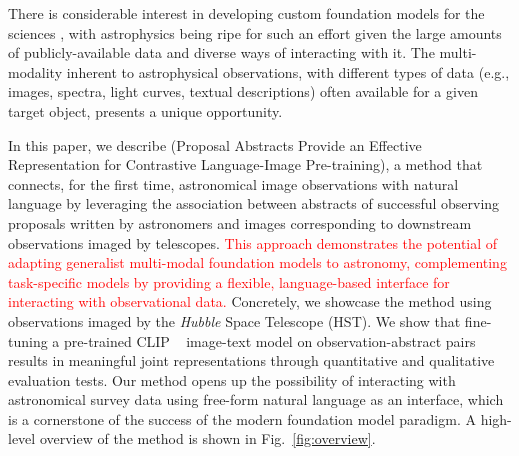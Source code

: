 \documentclass{article} %
\newcommand{\hubble}{\emph{Hubble}\xspace}
\newcommand{\changes}[1]{\textcolor{red}{#1}}
\begin{document}
There is considerable interest in developing custom foundation models for the sciences \citep[e.g., ][]{batatia2023foundation,subramanian2023towards,mccabe2023multiple,Birk:2024knn,vig2024finetuning,heinrich2024masked}, with astrophysics being ripe for such an effort given the large amounts of publicly-available data and diverse ways of interacting with it.
%
The multi-modality inherent to astrophysical observations, with different types of data (e.g., images, spectra, light curves, textual descriptions) often available for a given target object, presents a unique opportunity.
%

In this paper, we describe  (Proposal Abstracts Provide an Effective Representation for Contrastive Language-Image Pre-training),
a method that connects, for the first time, astronomical image observations with natural language by leveraging the association between abstracts of successful observing proposals written by astronomers and images corresponding to downstream observations imaged by telescopes. 
%
\changes{This approach demonstrates the potential of adapting generalist multi-modal foundation models to astronomy, complementing task-specific models by providing a flexible, language-based interface for interacting with observational data.}
%
Concretely, we showcase the method using observations imaged by the \hubble Space Telescope (HST).
%
We show that fine-tuning a pre-trained CLIP ~\citep[Contrastive Language-Image Pre-training; ][]{radford2021learning} image-text model on observation-abstract pairs results in meaningful joint representations through quantitative and qualitative evaluation tests.
%
Our method opens up the possibility of interacting with astronomical survey data using free-form natural language as an interface, which is a cornerstone of the success of the modern foundation model paradigm. A high-level overview of the method is shown in Fig.~\ref{fig:overview}.
%
\end{document}
